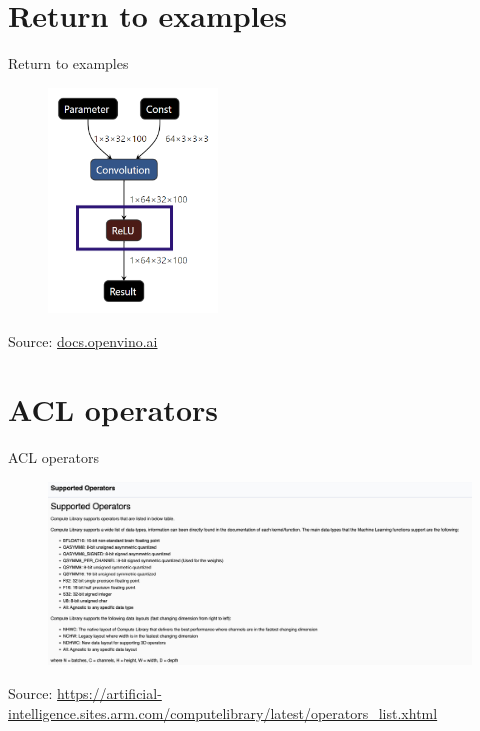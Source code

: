 \documentclass{beamer}
\begin{document}
\section{Return to examples}
\begin{frame}{Return to examples}
  \begin{figure}[h]
    \includegraphics[width=0.4\textwidth]{images/small_ir.png}
  \end{figure}
  \footnotesize Source: \href{https://docs.openvino.ai/}{docs.openvino.ai}
\end{frame}

\section{ACL operators}
\begin{frame}{ACL operators}
  \begin{figure}[h]
    \includegraphics[width=1\textwidth]{images/operators.png}
  \end{figure}
  \footnotesize Source: \href{https://artificial-intelligence.sites.arm.com/computelibrary/latest/operators_list.xhtml}{https://artificial-intelligence.sites.arm.com/computelibrary/latest/operators\_list.xhtml}
\end{frame}
\end{document}
